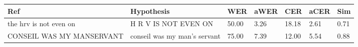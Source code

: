 \begin{table*}[ht!]
\renewcommand{\arraystretch}{1.3} %
\setlength{\tabcolsep}{4pt} %
\footnotesize %

\begin{tabular}{p{5cm}p{5cm}p{1cm}p{1cm}p{1cm}p{1cm}p{1cm}}
\toprule
Ref                                                                                                                                                                                                                                                                                          & Hypothesis                                                                                                                                                                                                                                                                                           & WER      & aWER  & CER    & aCER  & Sim \\
\midrule
the hrv is not even on                                                                                                                                                                                                                                                                             & H R V IS NOT EVEN ON                                                                                                                                                                                                                                                                                 & 50.00    & 3.26  & 18.18  & 2.61  & 0.71       \\
CONSEIL WAS MY MANSERVANT                                                                                                                                                                                                                                                                          & conseil was my man's servant                                                                                                                                                                                                                                                                         & 75.00    & 7.39  & 12.00  & 5.54  & 0.88       \\

\end{tabular}
\end{table*}
